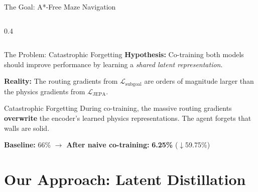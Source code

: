 \documentclass{beamer}
\begin{document}
\begin{frame}{The Goal: A*-Free Maze Navigation}
\begin{columns}[T]
\begin{column}{0.4\textwidth}
\begin{center}
            \end{center}
        \end{column}
    \end{columns}
\end{frame}

\begin{frame}{The Problem: Catastrophic Forgetting}
    \textbf{Hypothesis:} Co-training both models should improve performance by learning a \textit{shared latent representation}.

    \vspace{0.4cm}
    \textbf{Reality:} The routing gradients from $\mathcal{L}_{\text{subgoal}}$ are orders of magnitude larger than the physics gradients from $\mathcal{L}_{\text{JEPA}}$.

    \vspace{0.3cm}
    \begin{alertblock}{Catastrophic Forgetting}
        During co-training, the massive routing gradients \textbf{overwrite} the encoder's learned physics representations. The agent forgets that walls are solid.
    \end{alertblock}

    \vspace{0.3cm}
    \begin{center}
        \textbf{Baseline:} 66\% $\longrightarrow$ \textbf{After naive co-training:} \textcolor{failred}{\textbf{6.25\%}} \quad (\textcolor{failred}{$\downarrow$59.75\%})
    \end{center}
\end{frame}

\section{Our Approach: Latent Distillation}
\end{document}
